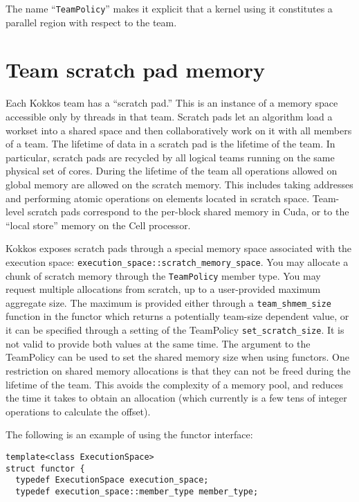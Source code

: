 \begin{enumerate}
The name ``\lstinline!TeamPolicy!'' makes it explicit that a kernel
using it constitutes a parallel region with respect to the team.

\section{Team scratch pad memory}\label{S:Hierarchical:Scratch}

Each Kokkos team has a ``scratch pad.''
This is an instance of a memory space accessible only by threads in that team.
Scratch pads let an algorithm load a workset into a shared space
and then collaboratively work on it with all members of a team.
The lifetime of data in a scratch pad is the lifetime of the team.
In particular, scratch pads are recycled by all logical teams running on the same physical set of cores.
During the lifetime of the team all operations allowed on global memory are allowed on the scratch memory.
This includes taking addresses and performing atomic operations on elements located in scratch space. 
Team-level scratch pads correspond to the per-block shared memory in Cuda,
or to the ``local store'' memory on the Cell processor.

Kokkos exposes scratch pads through a special memory space associated with the execution space:
\lstinline|execution_space::scratch_memory_space|.
You may allocate a chunk of scratch memory through the \lstinline|TeamPolicy| member type.
You may request multiple allocations from scratch, up to a user-provided maximum aggregate size. 
The maximum is provided either through a \lstinline|team_shmem_size| function in the functor which returns a potentially team-size dependent value, 
or it can be specified through a setting of the TeamPolicy \lstinline|set_scratch_size|. 
It is not valid to provide both values at the same time. 
The argument to the TeamPolicy can be used to set the shared memory size when using functors. 
One restriction on shared memory allocations is that they can not be freed during the lifetime of the team. 
This avoids the complexity of a memory pool,
and reduces the time it takes to obtain an allocation
(which currently is a few tens of integer operations to calculate the offset). 

The following is an example of using the functor interface:
\begin{lstlisting}
template<class ExecutionSpace>
struct functor {
  typedef ExecutionSpace execution_space;
  typedef execution_space::member_type member_type; 


\end{lstlisting}
\end{enumerate}
